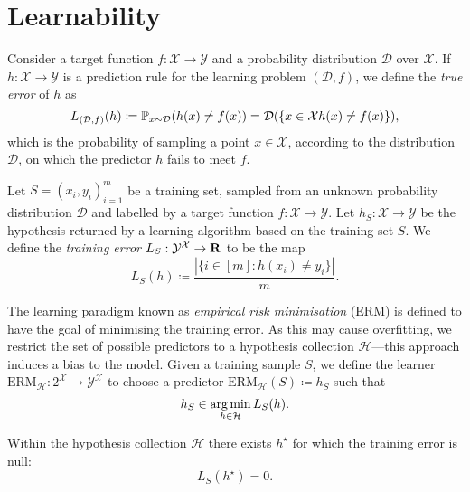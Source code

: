 \section{Learnability}

\begin{definition}
\label{def:true-error}
Consider a target function \(f: \mathcal{X} \to \mathcal{Y}\) and a probability
distribution \(\mathcal{D}\) over \(\mathcal{X}\). If
\(h: \mathcal{X} \to \mathcal{Y}\) is a prediction rule for the learning problem
\((\mathcal{D}, f)\), we define the \emph{true error} of \(h\) as
\[
L_{(\mathcal{D}, f)}(h)
\coloneq \operatorname{\mathbb{P}}_{x \sim \mathcal{D}}(h(x) \neq f(x))
= \mathcal{D}(\{x \in \mathcal{X} \relax h(x) \neq f(x)\}),
\]
which is the probability of sampling a point \(x \in \mathcal{X}\), according to
the distribution \(\mathcal{D}\), on which the predictor \(h\) fails to meet \(f\).
\end{definition}

\begin{definition}
\label{def:training-error}
Let \(S = (x_i, y_i)_{i=1}^m\) be a training set, sampled from an unknown
probability distribution \(\mathcal{D}\) and labelled by a target function
\(f: \mathcal{X} \to \mathcal{Y}\). Let \(h_S: \mathcal{X} \to \mathcal{Y}\) be
the hypothesis returned by a learning algorithm based on the training set
\(S\). We define the \emph{training error} \(L_S: \mathcal{Y}^{\mathcal{X}} \to
\mathbf{R}\) to be the map
\[
L_S(h) \coloneq \frac{|\{i \in [m] \colon h(x_i) \neq y_i\}|}{m}.
\]
\end{definition}

\begin{definition}
\label{def:empirical-risk-minimisation}
The learning paradigm known as \emph{empirical risk minimisation}
(ERM) is defined to have the goal of minimising the training
error. As this may cause overfitting, we restrict the set of possible predictors
to a hypothesis collection \(\mathcal{H}\)---this approach induces a bias to the
model. Given a training sample \(S\), we define the learner
\(\text{ERM}_{\mathcal{H}}: 2^{\mathcal{X}} \to \mathcal{Y}^{\mathcal{X}}\) to
choose a predictor \(\text{ERM}_{\mathcal{H}}(S) \coloneq h_S\) such that
\[
h_S \in \operatorname*{arg\,min}_{h \in \mathcal{H}} L_S(h).
\]
\end{definition}

\begin{definition}
\label{def:realisability-assumption}
Within the hypothesis collection \(\mathcal{H}\) there exists \(h^{\star}\) for
which the training error is null:
\[
L_S(h^{\star}) = 0.
\]
\end{definition}

